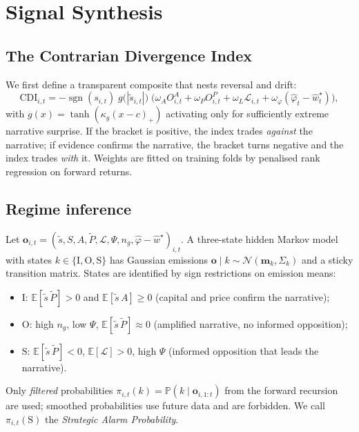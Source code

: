 \documentclass[11pt,a4paper]{article}
\theoremstyle{plain}
\theoremstyle{definition}
\theoremstyle{remark}
\newcommand{\E}{\mathbb{E}}
\newcommand{\Prob}{\mathbb{P}}
\newcommand{\N}{\mathcal{N}}
\DeclareMathOperator{\sgn}{sgn}
\begin{document}
\section{Signal Synthesis}\label{sec:synthesis}

\subsection{The Contrarian Divergence Index}
We first define a transparent composite that nests reversal and drift:
\begin{equation}
  \mathrm{CDI}_{i,t}=-\sgn(s_{i,t})\;g\big(|\tilde s_{i,t}|\big)\;\big(\omega_A O^{A}_{i,t}+\omega_P O^{P}_{i,t}+\omega_L\mathcal{L}_{i,t}+\omega_\varphi(\hat\varphi_t-\hat w^\star_t)\big),
\end{equation}
with $g(x)=\tanh(\kappa_g(x-c)_+)$ activating only for sufficiently extreme narrative surprise. If the bracket is positive, the index trades \emph{against} the narrative; if evidence confirms the narrative, the bracket turns negative and the index trades \emph{with} it. Weights are fitted on training folds by penalised rank regression on forward returns.

\subsection{Regime inference}
Let $\bm o_{i,t}=(\tilde s,S,A,\tilde P,\mathcal{L},\Psi,n_g,\hat\varphi-\hat w^\star)_{i,t}$. A three-state hidden Markov model \citep{hamilton1989} with states $k\in\{\mathrm{I},\mathrm{O},\mathrm{S}\}$ has Gaussian emissions $\bm o\mid k\sim\N(\bm m_k,\Sigma_k)$ and a sticky transition matrix. States are identified by sign restrictions on emission means:
\begin{itemize}
  \item $\mathrm{I}$: $\E[\tilde s\,\tilde P]>0$ and $\E[\tilde s\,A]\ge0$ (capital and price confirm the narrative);
  \item $\mathrm{O}$: high $n_g$, low $\Psi$, $\E[\tilde s\,\tilde P]\approx0$ (amplified narrative, no informed opposition);
  \item $\mathrm{S}$: $\E[\tilde s\,\tilde P]<0$, $\E[\mathcal{L}]>0$, high $\Psi$ (informed opposition that leads the narrative).
\end{itemize}
Only \emph{filtered} probabilities $\pi_{i,t}(k)=\Prob(k\mid\bm o_{i,1:t})$ from the forward recursion are used; smoothed probabilities use future data and are forbidden. We call $\pi_{i,t}(\mathrm{S})$ the \emph{Strategic Alarm Probability}.
\end{document}
